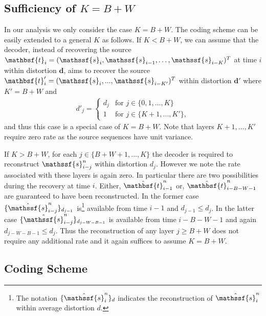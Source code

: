 \documentclass[journal, twocolumn, 10pt]{IEEEtran}
\newcommand{\bd}{{\mathbf{d}}}
\newcommand{\rvs}{{\mathssf{s}}}    %
\newcommand{\rvbt}{{\mathbsf{t}}}
\begin{document}
{\subsection{Sufficiency of $K=B+W$}
\label{subsec:Sufficiency}
In our analysis we only consider the case $K=B+W$. The coding scheme can be easily extended to a general $K$ as follows. If $K<B+W$, we can assume that the decoder, instead of recovering the source $\rvbt_{i}=(\rvs_{i}, \rvs_{i-1}, \ldots, \rvs_{i-K})^{T}$ at time $i$ within distortion $\bd$,  aims to recover the source $\rvbt'_{i}=(\rvs_{i}, ..., \rvs_{i-K'})^{T}$ within distortion $\bd'$ where $K'=B+W$ and 
\begin{align}
d'_{j}=\begin{cases}
d_{j} &\mbox{for } j\in\{0, 1, ..., K\}\\
1&\mbox{for } j\in\{K+1, ..., K'\},
\end{cases}
\end{align}
and thus this case is a special case of ${K=B+W}$. Note that  layers $K+1,\ldots, K'$ require zero rate as the source sequences have unit variance.

If ${K>B+W}$, for each $j\in\{B+W+1, \ldots, K\}$ the decoder is required to reconstruct $\rvs^n_{i-j}$ within distortion $d_{j}$. However we note the rate associated with these layers is again zero. In particular there are two possibilities during the recovery at time $i$. Either, $\hat{\rvbt}_{i-1}^n$ or, $\hat{\rvbt}_{i-B-W-1}^n$ are guaranteed to have been reconstructed. In the former case
$\{\hat{\rvs}^n_{i-j}\}_{d_{j-1}}$ is\footnote{The notation $\{\hat{\rvs}_{i}^n\}_{d}$ indicates the reconstruction of $\hat{\rvs}_{i}^n$ within average distortion $d$.} available from time $i-1$ and $d_{j-1}\le d_{j}$. In the latter case
$\{\hat{\rvs}^n_{i-j}\}_{d_{j-W-B-1}}$ is available from time $i-B-W-1$ and again $d_{j-W-B-1}\le d_{j}$.
 Thus the reconstruction of any layer $j\ge B+W$  does not require any additional rate and it again suffices to assume ${K=B+W}$.

\subsection{Coding Scheme}
\label{subsec:Gauss-Coding}
\begin{figure}
\vspace{1em}
\begin{center}
%
%
%
%
%
%
%


\end{center}
\end{figure}}
\end{document}
